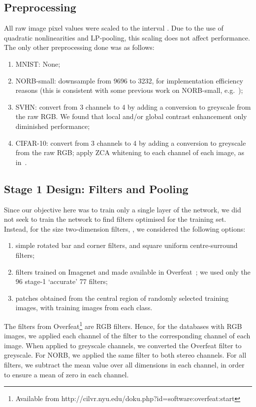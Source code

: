 \documentclass[conference]{IEEEtran}
\begin{document}
\subsection{Preprocessing}

All raw image pixel values were scaled to the interval . Due to the use of quadratic nonlinearities and LP-pooling, this scaling does not affect performance. The only other preprocessing done was as follows:
\begin{enumerate}
\item MNIST: None;
\item NORB-small: downsample from 9696 to 3232, for implementation efficiency reasons (this is consistent with some previous work on NORB-small, e.g.~\cite{Le.10});
\item SVHN: convert from 3 channels to 4 by adding a conversion to greyscale from the raw RGB. We found that local and/or global contrast enhancement only diminished performance;
\item CIFAR-10: convert from 3 channels to 4 by adding a conversion to greyscale from the raw RGB; apply ZCA whitening to each channel of each image, as in~\cite{Coates.11}.
\end{enumerate}


\subsection{Stage 1 Design: Filters and Pooling}\label{S:s1design}\label{S:filters}

Since our objective here was to train only a single layer of the network, we did not seek to train the network to find filters optimised for the training set. Instead, for the size  two-dimension filters, , we considered the following options:
\begin{enumerate}
\item simple rotated bar and corner filters, and square uniform centre-surround filters;
\item filters trained on Imagenet and made available in Overfeat~\cite{Sermanet.14_overfeat}; we used only the 96 stage-1 `accurate' 77 filters;
\item patches obtained  from the central  region of randomly selected training images, with  training images from each class.
\end{enumerate}
The  filters from Overfeat\footnote{Available from http://cilvr.nyu.edu/doku.php?id=software:overfeat:start} are RGB filters. Hence, for the databases with RGB images, we applied each channel of the filter to the corresponding channel of each image. When applied to greyscale channels, we converted the Overfeat filter to greyscale. For NORB, we applied the same filter to both stereo channels. For all filters, we subtract the mean value over all  dimensions in each channel, in order to ensure a mean of zero in each channel.
\end{document}
